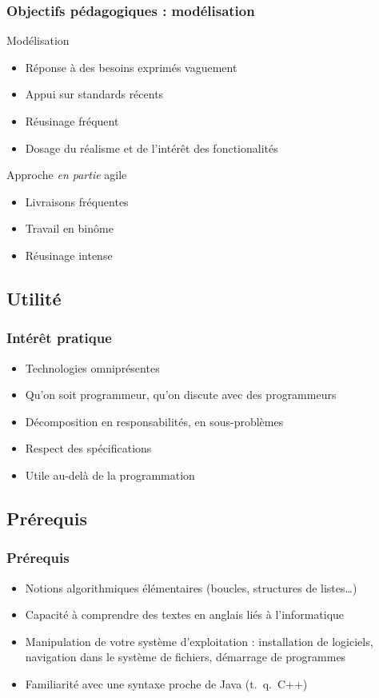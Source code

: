 \documentclass[english, french]{beamer}
\begin{document}
\begin{frame}
	\frametitle{Objectifs pédagogiques : modélisation}
	\begin{block}{Modélisation}
		\begin{itemize}
		\item Réponse à des besoins exprimés vaguement
		\item Appui sur standards récents
		\item Réusinage fréquent
		\item Dosage du réalisme et de l’intérêt des fonctionalités
		\end{itemize}
	\end{block}
	Approche \emph{en partie} agile
	\begin{itemize}
		\item Livraisons fréquentes
		\item Travail en binôme
		\item Réusinage intense
	\end{itemize}
\end{frame}

\subsection{Utilité}
\begin{frame}
	\frametitle{Intérêt pratique}
	\begin{itemize}
		\item Technologies omniprésentes %
		\item Qu’on soit programmeur, qu’on discute avec des programmeurs
		\item Décomposition en responsabilités, en sous-problèmes
		\item Respect des spécifications
		\item Utile au-delà de la programmation
	\end{itemize}
\end{frame}

\subsection{Prérequis}
\begin{frame}
	\frametitle{Prérequis}
	\begin{itemize}
		\item Notions algorithmiques élémentaires (boucles, structures de listes…)
		\item Capacité à comprendre des textes en anglais liés à l’informatique
		\item Manipulation de votre système d’exploitation : installation de logiciels, navigation dans le système de fichiers, démarrage de programmes
		\item Familiarité avec une syntaxe proche de Java (t.\ q.\ C++)
	\end{itemize}
\end{frame}
\end{document}
